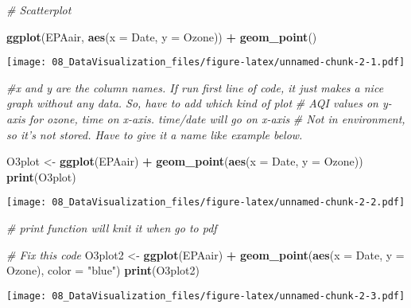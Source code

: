 \documentclass[]{article}
\newenvironment{Shaded}{\begin{snugshade}}{\end{snugshade}}
\newcommand{\KeywordTok}[1]{\textcolor[rgb]{0.13,0.29,0.53}{\textbf{#1}}}
\newcommand{\DataTypeTok}[1]{\textcolor[rgb]{0.13,0.29,0.53}{#1}}
\newcommand{\StringTok}[1]{\textcolor[rgb]{0.31,0.60,0.02}{#1}}
\newcommand{\CommentTok}[1]{\textcolor[rgb]{0.56,0.35,0.01}{\textit{#1}}}
\newcommand{\OperatorTok}[1]{\textcolor[rgb]{0.81,0.36,0.00}{\textbf{#1}}}
\newcommand{\NormalTok}[1]{#1}
\begin{document}
\begin{Shaded}
\begin{Highlighting}[]
\CommentTok{# Scatterplot}

\KeywordTok{ggplot}\NormalTok{(EPAair, }\KeywordTok{aes}\NormalTok{(}\DataTypeTok{x =}\NormalTok{ Date, }\DataTypeTok{y =}\NormalTok{ Ozone)) }\OperatorTok{+}\StringTok{ }
\StringTok{  }\KeywordTok{geom_point}\NormalTok{()}
\end{Highlighting}
\end{Shaded}

\texttt{[image: 08\_DataVisualization\_files/figure-latex/unnamed-chunk-2-1.pdf]}

\begin{Shaded}
\begin{Highlighting}[]
\CommentTok{#x and y are the column names. If run first line of code, it just makes a nice graph without any data. So, have to add which kind of plot }
\CommentTok{# AQI values on y-axis for ozone, time on x-axis. time/date will go on x-axis}
\CommentTok{# Not in environment, so it's not stored. Have to give it a name like example below.}

\NormalTok{O3plot <-}\StringTok{ }\KeywordTok{ggplot}\NormalTok{(EPAair) }\OperatorTok{+}
\StringTok{  }\KeywordTok{geom_point}\NormalTok{(}\KeywordTok{aes}\NormalTok{(}\DataTypeTok{x =}\NormalTok{ Date, }\DataTypeTok{y =}\NormalTok{ Ozone))}
\KeywordTok{print}\NormalTok{(O3plot)}
\end{Highlighting}
\end{Shaded}

\texttt{[image: 08\_DataVisualization\_files/figure-latex/unnamed-chunk-2-2.pdf]}

\begin{Shaded}
\begin{Highlighting}[]
\CommentTok{# print function will knit it when go to pdf}

\CommentTok{# Fix this code}
\NormalTok{O3plot2 <-}\StringTok{ }\KeywordTok{ggplot}\NormalTok{(EPAair) }\OperatorTok{+}
\StringTok{  }\KeywordTok{geom_point}\NormalTok{(}\KeywordTok{aes}\NormalTok{(}\DataTypeTok{x =}\NormalTok{ Date, }\DataTypeTok{y =}\NormalTok{ Ozone), }\DataTypeTok{color =} \StringTok{"blue"}\NormalTok{)}
\KeywordTok{print}\NormalTok{(O3plot2)}
\end{Highlighting}
\end{Shaded}

\texttt{[image: 08\_DataVisualization\_files/figure-latex/unnamed-chunk-2-3.pdf]}
\end{document}
